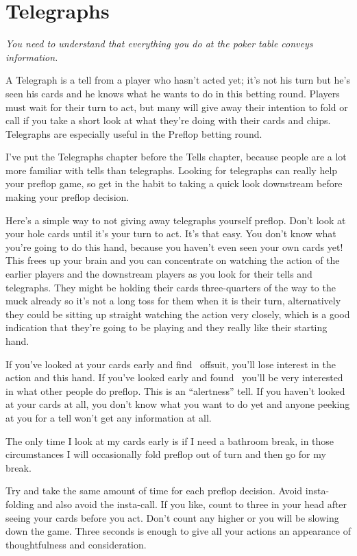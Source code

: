 \chapter{Telegraphs}

\textit{You need to understand that everything you do at the poker
table conveys information.}


A Telegraph is a tell from a player who hasn't acted yet; it's not his
turn but he's seen his cards and he knows what he wants to do in this
betting round. Players must wait for their turn to act, but many will
give away their intention to fold or call if you take a short look at
what they're doing with their cards and chips. Telegraphs are
especially useful in the Preflop betting round.

I've put the Telegraphs chapter before the Tells chapter,
because people are a lot more familiar with tells than
telegraphs. Looking for telegraphs can really help your preflop game,
so get in the habit to taking a quick look downstream before
making your preflop decision.

Here's a simple way to not giving away telegraphs yourself preflop.
Don't look at your hole cards until it's your turn to act. It's that easy.
You don't know what you're going to do this hand, because
you haven't even seen your own cards yet! This frees up your brain
and you can concentrate on watching the action of the earlier players
and the downstream players as you look for their tells and telegraphs.
They might be holding their cards three-quarters of the way to the
muck already so it's not a long toss for them when it is their
turn, alternatively they could be sitting up straight watching
the action very closely, which is a good indication that they're
going to be playing and they really like their starting hand.

If you've looked at your cards early and find \sevh\trec\ offsuit,
you'll lose interest in the action and this hand. If you've looked
early and found \Kc\Ks\ you'll be very interested in what other people
do preflop. This is an ``alertness'' tell. If you haven't looked at
your cards at all, you don't know what you want to do yet and anyone
peeking at you for a tell won't get any information at all.

The only time I look at my cards early is if I need a bathroom break,
in those circumstances I will occasionally fold preflop out of turn
and then go for my break.

Try and take the same amount of time for each preflop decision.
Avoid insta-folding and also avoid the insta-call. If you like,
count to three in your head after seeing your cards before you act.
Don't count any higher or you will be slowing down the game. Three
seconds is enough to give all your actions an appearance of
thoughtfulness and consideration.

